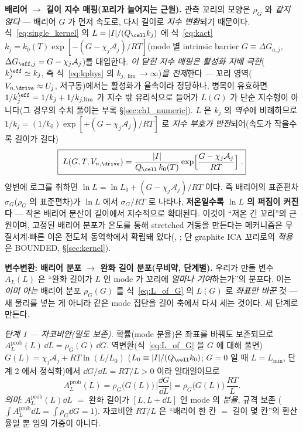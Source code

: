 \textbf{배리어 $\to$ 길이 지수 매핑(꼬리가 늘어지는 근원).} 관측 꼬리의 모양은 $\rho_G$ 와 \emph{같지 않다}
— 배리어 $G$ 가 먼저 속도로, 다시 길이로 \emph{지수 변환}되기 때문이다. 식~\eqref{eq:single_kernel} 의
$L=|I|/(Q_\cell k_j)$ 에 식~\eqref{eq:kact} $k_j=k_0(T)\exp[-(G-\chi_j\mathcal A_j)/RT]$(mode 별 intrinsic
barrier $G\equiv\Delta G_{a,j}$, $\Delta G_{\eff,j}=G-\chi_j\mathcal A_j$)를 대입한다. \emph{이 닫힌 지수 매핑은
활성화 지배 극한}($k_j^{\eff}\simeq k_j$, 즉 식~\eqref{eq:kphys} 의 $k_{j,\lim}\to\infty$)\emph{을 전제}한다 — 꼬리
영역($V_{n,\drive}\approx U_j$, 저구동)에서는 활성화가 율속이라 정당하나, 병목이 유효하면
$1/k_j^{\eff}=1/k_j+1/k_{j,\lim}$ 가 지수 밖 유리식으로 들어가 $L(G)$ 가 단순 지수형이 아니다(그 경우의 수치 풀이는
부록 \S\ref{sec:ch1_numeric}). $L$ 은 $k_j$ 의 \emph{역수}에 비례하므로 $1/k_j=(1/k_0)\exp[+(G-\chi_j\mathcal A_j)/RT]$ 로
\emph{지수 부호가 반전}되어(속도가 작을수록 길이가 길다)
\begin{equation}
\boxed{\;L(G,T,V_{n,\drive})=\frac{|I|}{Q_\cell\,k_0(T)}\exp\!\Big[\frac{G-\chi_j\mathcal A_j}{RT}\Big]\;.}
\label{eq:L_of_G}
\end{equation}
양변에 로그를 취하면 $\ln L=\ln L_0+(G-\chi_j\mathcal A_j)/RT$ 이다. 즉 배리어의 표준편차 $\sigma_G$($\rho_G$ 의
표준편차)가 $\ln L$ 에서 $\sigma_G/RT$ 로 나타나, \textbf{저온일수록 $\ln L$ 의 퍼짐이 커진다} — 작은 배리어 분산이 길이에서
지수적으로 확대된다. 이것이 ``저온 긴 꼬리''의 근원이며, 고정된 배리어 분포가 온도를 통해 stretched 거동을
만든다는 메커니즘은 무질서계$\cdot$빠른 이온 전도체 동역학에서 확립돼 있다(,
\cite{svare2000,johnston2006,lindsey1980}; 단 graphite ICA 꼬리로의 \emph{적용}은 BOUNDED, \S\ref{sec:kernel}).

\textbf{변수변환: 배리어 분포 $\to$ 완화 길이 분포(무비약, 단계별).} 우리가 만들 변수 $A_L(L)$ 은 ``완화 길이가
$L$ 인 mode 가 꼬리에 \emph{얼마나 기여}하는가''의 분포다. 이는 \emph{이미 아는} 배리어 분포 $\rho_G(G)$ 를
식~\eqref{eq:L_of_G} 의 $L(G)$ 로 \emph{좌표만 바꾼} 것 — 새 물리를 넣는 게 아니라 같은 mode 집단을 길이 축에서
다시 세는 것이다. 세 단계로 만든다.

\emph{단계 1 — 자코비안(밀도 보존).} 확률(mode 분율)은 좌표를 바꿔도 보존되므로 $A_L^{\mathrm{prob}}(L)\,\dd L
=\rho_G(G)\,\dd G$. 역변환(식~\eqref{eq:L_of_G} 을 $G$ 에 대해 풀면) $G(L)=\chi_j\mathcal A_j+RT\ln(L/L_0)$
($L_0\equiv|I|/(Q_\cell k_0)$; $G=0$ 일 때 $L=L_{\min}$, 단계 2 에서 정식화)에서 $\dd G/\dd L=RT/L>0$ 이라
일대일이므로
\begin{equation}
A_L^{\mathrm{prob}}(L)=\rho_G\big(G(L)\big)\,\Big|\frac{\dd G}{\dd L}\Big|=\rho_G\big(G(L)\big)\,\frac{RT}{L}.
\label{eq:spectrum_prob}
\end{equation}
\emph{의미}: $A_L^{\mathrm{prob}}(L)\dd L$ $=$ 완화 길이가 $[L,L+\dd L]$ 인 mode 의 \emph{분율}, 규격 보존
($\int A_L^{\mathrm{prob}}\dd L=\int\rho_G\dd G=1$). 자코비안 $RT/L$ 은 ``배리어 한 칸 $=$ 길이 몇 칸''의 환산율일
뿐 임의 가중이 아니다.

